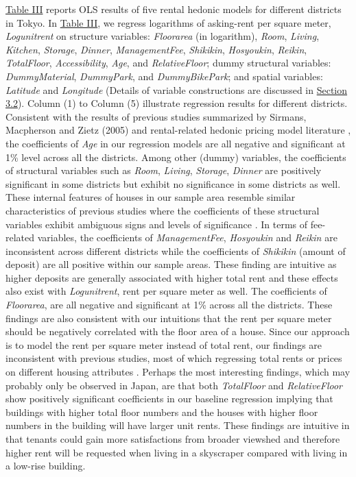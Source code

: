 \documentclass[a4paper, 12pt]{article} %
\newcommand{\var}[1][\textit]{#1}
\begin{document}
\hyperref[tb3]{Table III} reports OLS results of five rental hedonic models for different districts in Tokyo. In \hyperref[tb3]{Table III}, we regress logarithms of asking-rent per square meter, \var{Logunitrent} on structure variables: \var{Floorarea} (in logarithm), \var{Room}, \var{Living}, \var{Kitchen}, \var{Storage}, \var{Dinner}, \var{ManagementFee}, \var{Shikikin}, \var{Hosyoukin}, \var{Reikin}, \var{TotalFloor}, \var{Accessibility}, \var{Age}, and \var{RelativeFloor}; dummy structural variables: \var{DummyMaterial}, \var{DummyPark}, and \var{DummyBikePark}; and spatial variables: \var{Latitude} and \var{Longitude} (Details of variable constructions are discussed in \hyperref[sec32]{Section 3.2}). Column (1) to Column (5) illustrate regression results for different districts. Consistent with the results of previous studies summarized by Sirmans, Macpherson and Zietz (2005) and rental-related hedonic pricing model literature \citep{djurdjevic2008estimation, seya2011empirical}, the coefficients of \var{Age} in our regression models are all negative and significant at 1\% level across all the districts. Among other (dummy) variables, the coefficients of structural variables such as \var{Room}, \var{Living}, \var{Storage}, \var{Dinner} are positively significant in some districts but exhibit no significance in some districts as well. These internal features of houses in our sample area resemble similar characteristics of previous studies where the coefficients of these structural variables exhibit ambiguous signs and levels of significance \citep{sirmans2005composition}. In terms of fee-related variables, the coefficients of \var{ManagementFee}, \var{Hosyoukin} and \var{Reikin} are inconsistent across different districts while the coefficients of \var{Shikikin} (amount of deposit) are all positive within our sample areas. These finding are intuitive as higher deposits are generally associated with higher total rent and these effects also exist with \var{Logunitrent}, rent per square meter as well. The coefficients of \var{Floorarea}, are all negative and significant at 1\% across all the districts. These findings are also consistent with our intuitions that the rent per square meter should be negatively correlated with the floor area of a house. Since our approach is to model the rent per square meter instead of total rent, our findings are inconsistent with previous studies, most of which regressing total rents or prices on different housing attributes \citep{sirmans2005composition}. Perhaps the most interesting findings, which may probably only be observed in Japan, are that both \var{TotalFloor} and \var{RelativeFloor} show positively significant coefficients in our baseline regression implying that buildings with higher total floor numbers and the houses with higher floor numbers in the building will have larger unit rents. These findings are intuitive in that tenants could gain more satisfactions from broader viewshed and therefore higher rent will be requested when living in a skyscraper compared with living in a low-rise building. 
\end{document}

